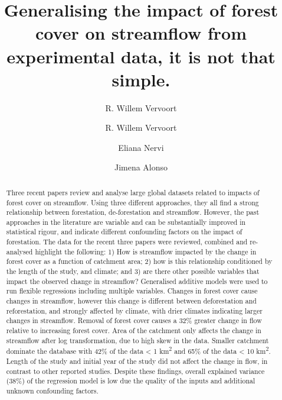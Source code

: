 \documentclass[]{elsarticle} %
\begin{document}
\begin{frontmatter}

  \title{Generalising the impact of forest cover on streamflow from experimental data, it is not that simple.}
    \author[a,b]{R. Willem Vervoort}
    \author[]{R. Willem Vervoort}
  
    \author[c]{Eliana Nervi}
    \author[d]{Jimena Alonso}
  
  \begin{abstract}
  Three recent papers review and analyse large global datasets related to impacts of forest cover on streamflow. Using three different approaches, they all find a strong relationship between forestation, de-forestation and streamflow. However, the past approaches in the literature are variable and can be substantially improved in statistical rigour, and indicate different confounding factors on the impact of forestation. The data for the recent three papers were reviewed, combined and re-analysed highlight the following: 1) How is streamflow impacted by the change in forest cover as a function of catchment area; 2) how is this relationship conditioned by the length of the study, and climate; and 3) are there other possible variables that impact the observed change in streamflow? Generalised additive models were used to run flexible regressions including multiple variables.
  Changes in forest cover cause changes in streamflow, however this change is different between deforestation and reforestation, and strongly affected by climate, with drier climates indicating larger changes in streamflow. Removal of forest cover causes a 32\% greater change in flow relative to increasing forest cover. Area of the catchment only affects the change in streamflow after log transformation, due to high skew in the data. Smaller catchment dominate the database with 42\% of the data \textless{} 1 km\textsuperscript{2} and 65\% of the data \textless{} 10 km\textsuperscript{2}. Length of the study and initial year of the study did not affect the change in flow, in contrast to other reported studies. Despite these findings, overall explained variance (38\%) of the regression model is low due the quality of the inputs and additional unknown confounding factors.
  \end{abstract}
  
 \end{frontmatter}
\end{document}
